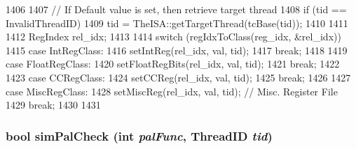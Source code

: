 \begin{DoxyCode}
1406 {
1407     // If Default value is set, then retrieve target thread
1408     if (tid == InvalidThreadID) {
1409         tid = TheISA::getTargetThread(tcBase(tid));
1410     }
1411 
1412     RegIndex rel_idx;
1413 
1414     switch (regIdxToClass(reg_idx, &rel_idx)) {
1415       case IntRegClass:
1416         setIntReg(rel_idx, val, tid);
1417         break;
1418 
1419       case FloatRegClass:
1420         setFloatRegBits(rel_idx, val, tid);
1421         break;
1422 
1423       case CCRegClass:
1424         setCCReg(rel_idx, val, tid);
1425         break;
1426 
1427       case MiscRegClass:
1428         setMiscReg(rel_idx, val, tid); // Misc. Register File
1429         break;
1430     }
1431 }
\end{DoxyCode}
\hypertarget{classInOrderCPU_a875eebdeba298f450fe84b0a05349afe}{
\subsubsection[{simPalCheck}]{\setlength{\rightskip}{0pt plus 5cm}bool simPalCheck (int {\em palFunc}, \/  {\bf ThreadID} {\em tid})}}
\label{classInOrderCPU_a875eebdeba298f450fe84b0a05349afe}




